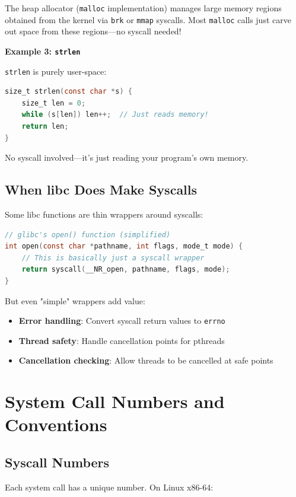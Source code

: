 The heap allocator (\texttt{malloc} implementation) manages large memory regions obtained from the kernel via \texttt{brk} or \texttt{mmap} syscalls. Most \texttt{malloc} calls just carve out space from these regions—no syscall needed!

\textbf{Example 3: \texttt{strlen}}

\texttt{strlen} is purely user-space:

\begin{lstlisting}[language=C]
size_t strlen(const char *s) {
    size_t len = 0;
    while (s[len]) len++;  // Just reads memory!
    return len;
}
\end{lstlisting}

No syscall involved—it's just reading your program's own memory.

\subsection{When libc Does Make Syscalls}

Some libc functions are thin wrappers around syscalls:

\begin{lstlisting}[language=C]
// glibc's open() function (simplified)
int open(const char *pathname, int flags, mode_t mode) {
    // This is basically just a syscall wrapper
    return syscall(__NR_open, pathname, flags, mode);
}
\end{lstlisting}

But even "simple" wrappers add value:
\begin{itemize}
    \item \textbf{Error handling}: Convert syscall return values to \texttt{errno}
    \item \textbf{Thread safety}: Handle cancellation points for pthreads
    \item \textbf{Cancellation checking}: Allow threads to be cancelled at safe points
\end{itemize}

\section{System Call Numbers and Conventions}

\subsection{Syscall Numbers}

Each system call has a unique number. On Linux x86-64:

